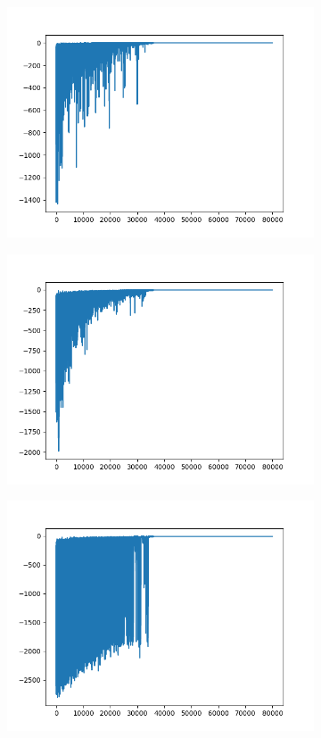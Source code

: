 \begin{figure}[H]
	\begin{subfigure}{.25\textwidth}
		\includegraphics[width=\textwidth]{img/train/matrice_16-11_42_34.png}
	\end{subfigure}%
	\begin{subfigure}{.25\textwidth}
		\includegraphics[width=\textwidth]{img/train/matrice_17-11_45_40.png}
	\end{subfigure}%
	\begin{subfigure}{.25\textwidth}
		\includegraphics[width=\textwidth]{img/train/matrice_18-11_57_31.png}

\end{subfigure}
\end{figure}
